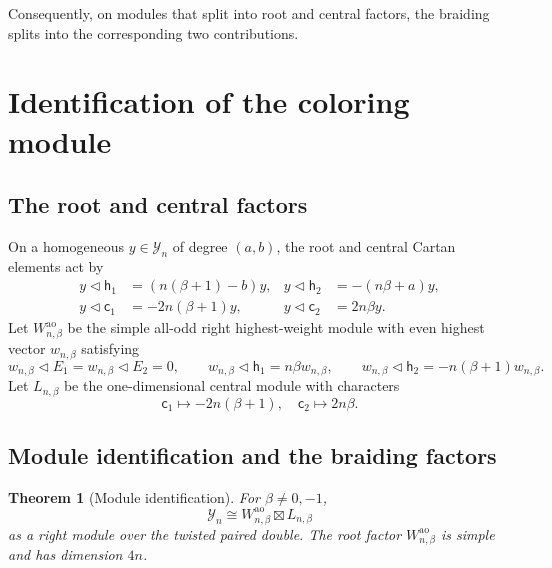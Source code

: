 \documentclass[11pt,a4paper]{article}
\newcommand{\tri}{\mathbin{\triangleleft}}
\newcommand{\ao}{\mathrm{ao}}
\newtheorem{theorem}{Theorem}[section]
\theoremstyle{definition}
\theoremstyle{remark}
\begin{document}
Consequently, on modules that split into root and central factors,
the braiding splits into the corresponding two contributions.

\section{Identification of the coloring module}\label{sec:module}

\subsection{The root and central factors}

On a homogeneous \(y\in\mathcal Y_n\) of degree \((a,b)\), the root and
central Cartan elements act by
\begin{equation}\label{eq:root-center-actions}
\begin{aligned}
 y\tri\mathsf h_1&=(n(\beta+1)-b)y,&
 y\tri\mathsf h_2&=-(n\beta+a)y,\\
 y\tri\mathsf c_1&=-2n(\beta+1)y,&
 y\tri\mathsf c_2&=2n\beta y.
\end{aligned}
\end{equation}
Let \(W_{n,\beta}^{\ao}\) be the simple all-odd right highest-weight module with
even highest vector \(w_{n,\beta}\) satisfying
\begin{equation}\label{eq:highest-weight}
 w_{n,\beta}\tri E_1=w_{n,\beta}\tri E_2=0,\qquad
 w_{n,\beta}\tri\mathsf h_1=n\beta w_{n,\beta},\qquad
 w_{n,\beta}\tri\mathsf h_2=-n(\beta+1)w_{n,\beta}.
\end{equation}
Let \(L_{n,\beta}\) be the one-dimensional central module with characters
\[
 \mathsf c_1\mapsto-2n(\beta+1),\quad
 \mathsf c_2\mapsto2n\beta.
\]

\subsection{Module identification and the braiding factors}

\begin{theorem}[Module identification]\label{thm:object}
For \(\beta\neq0,-1\),
\begin{equation}\label{eq:object}
 \mathcal Y_n
 \cong W_{n,\beta}^{\ao}\boxtimes L_{n,\beta}
\end{equation}
as a right module over the twisted paired double.  The root factor
\(W_{n,\beta}^{\ao}\) is simple and has dimension \(4n\).
\end{theorem}
\end{document}
